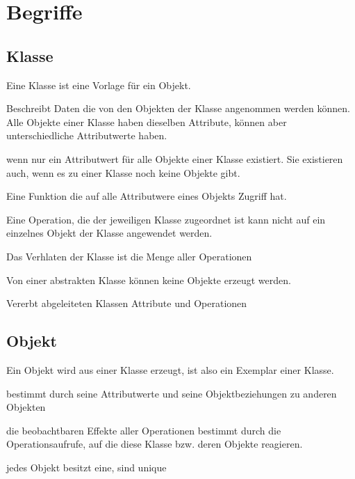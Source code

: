 \section{Begriffe}
\subsection{Klasse}
	Eine Klasse ist eine Vorlage für ein Objekt.\\
	\begin{description}[style=multiline,leftmargin=3.5cm,rightmargin=2cm, topsep=0pt]
	\item[Attribut] Beschreibt Daten die von den Objekten der Klasse angenommen
		werden können. Alle Objekte einer Klasse haben dieselben Attribute, können
		aber unterschiedliche Attributwerte haben.
	\item[Klassenattribut] wenn nur ein Attributwert für alle Objekte einer Klasse
		existiert. Sie existieren auch, wenn es zu einer Klasse noch keine Objekte
		gibt.
	\item[Operation] Eine Funktion die auf alle Attributwere eines Objekts Zugriff
		hat.
	\item[Klassenoperation] Eine Operation, die der jeweiligen Klasse zugeordnet
		ist kann nicht auf ein einzelnes Objekt der Klasse angewendet werden. 
	\item[Verhalten] Das Verhlaten der Klasse ist die Menge aller Operationen
	\item[Abstrakte] Von einer abstrakten Klasse können keine Objekte erzeugt
		werden.
	\item[Basisklasse] Vererbt abgeleiteten Klassen Attribute und Operationen
	\end{description}
	
\subsection{Objekt}
	Ein Objekt wird aus einer Klasse erzeugt, ist also ein Exemplar einer Klasse.
	\begin{description}[style=multiline,leftmargin=3.5cm,rightmargin=2cm, topsep=0pt]
		\item[Zustand] bestimmt durch seine Attributwerte und seine
		Objektbeziehungen zu anderen Objekten
		\item[Verhalten (behavior)] die beobachtbaren Effekte aller Operationen
		 bestimmt durch die Operationsaufrufe, auf die diese Klasse bzw. deren Objekte
		reagieren.
		\item[Objektidendität] jedes Objekt besitzt eine, sind unique
	\end{description}
